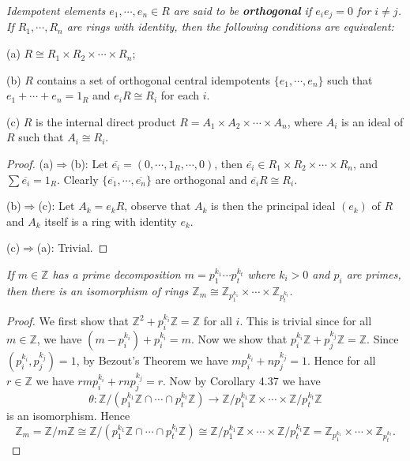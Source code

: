 \begin{problem}\em
Idempotent elements $e_1,\cdots,e_n\in R$ are said to be \textbf{orthogonal} if $e_ie_j=0$ for $i\ne j$. If $R_1,\cdots,R_n$ are rings with identity, then the following conditions are equivalent:\par
(a) $R\cong R_1\times R_2\times\cdots\times R_n$;\par
(b) $R$ contains a set of orthogonal central idempotents $\{e_1,\cdots,e_n\}$ such that $e_1+\cdots+e_n=1_R$ and $e_iR\cong R_i$ for each $i$.\par
(c) $R$ is the internal direct product $R=A_1\times A_2\times\cdots\times A_n$, where $A_i$ is an ideal of $R$ such that $A_i\cong R_i$.
\end{problem}
\begin{proof}
(a)$\Rightarrow$(b): Let $\overline{e_i}=(0,\cdots,1_R,\cdots,0)$, then $\overline{e_i}\in R_1\times R_2\times\cdots\times R_n$, and $\sum\overline{e_i}=1_R$. Clearly $\{\overline{e_1},\cdots,\overline{e_n}\}$ are orthogonal and $\overline{e_i}R\cong R_i$.\par
(b)$\Rightarrow$(c): Let $A_k=e_kR$, observe that $A_k$ is then the principal ideal $(e_k)$ of $R$ and $A_k$ itself is a ring with identity $e_k$.\par
(c)$\Rightarrow$(a): Trivial.
\end{proof}
\begin{problem}\em
If $m\in\mathbb{Z}$ has a prime decomposition $m=p_1^{k_1}\cdots p_t^{k_t}$ where $k_i>0$ and $p_i$ are primes, then there is an isomorphism of rings $\mathbb{Z}_m\cong\mathbb{Z}_{p_1^{k_1}}\times\cdots\times\mathbb{Z}_{p_t^{k_t}}$.
\end{problem}
\begin{proof}
We first show that $\mathbb{Z}^2+p_i^{k_i}\mathbb{Z}=\mathbb{Z}$ for all $i$. This is trivial since for all $m\in\mathbb{Z}$, we have $(m-p_i^{k_i})+p_i^{k_i}=m$. Now we show that $p_i^{k_i}\mathbb{Z}+p_j^{k_j}\mathbb{Z}=\mathbb{Z}$. Since $(p_i^{k_i},p_j^{k_j})=1$, by Bezout's Theorem we have $mp_i^{k_i}+np_j^{k_j}=1$. Hence for all $r\in\mathbb{Z}$ we have $rmp_i^{k_i}+rnp_j^{k_j}=r$. Now by Corollary 4.37 we have
$$
\theta :\mathbb{Z} /\left( p_{1}^{k_1}\mathbb{Z} \cap \cdots \cap p_{t}^{k_t}\mathbb{Z} \right) \rightarrow \mathbb{Z} /p_{1}^{k_1}\mathbb{Z} \times \cdots \times \mathbb{Z} /p_{t}^{k_t}\mathbb{Z} 
$$
is an isomorphism. Hence
$$
\mathbb{Z} _m=\mathbb{Z} /m\mathbb{Z} \cong \mathbb{Z} /\left( p_{1}^{k_1}\mathbb{Z} \cap \cdots \cap p_{t}^{k_t}\mathbb{Z} \right) \cong \mathbb{Z} /p_{1}^{k_1}\mathbb{Z} \times \cdots \times \mathbb{Z} /p_{t}^{k_t}\mathbb{Z} =\mathbb{Z} _{p_{1}^{k_1}}\times \cdots \times \mathbb{Z} _{p_{t}^{k_t}}.
$$
\end{proof}
